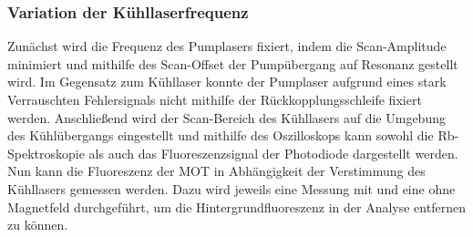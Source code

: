 \documentclass[11pt, a4paper]{article}
\numberwithin{equation}{section}
\begin{document}
\subsubsection{Variation der Kühllaserfrequenz}
\label{sec:detuning_cooling}
Zunächst wird die Frequenz des Pumplasers fixiert, indem die Scan-Amplitude minimiert und mithilfe des Scan-Offset der Pumpübergang auf Resonanz gestellt wird.
Im Gegensatz zum Kühllaser konnte der Pumplaser aufgrund eines stark Verrauschten Fehlersignals nicht mithilfe der Rückkopplungsschleife fixiert werden.
Anschließend wird der Scan-Bereich des Kühllasers auf die Umgebung des Kühlübergangs eingestellt und mithilfe des Oszilloskops kann sowohl die Rb-Spektroskopie als auch das Fluoreszenzsignal der Photodiode dargestellt werden.
Nun kann die Fluoreszenz der MOT in Abhängigkeit der Verstimmung des Kühllasers gemessen werden.
Dazu wird jeweils eine Messung mit und eine ohne Magnetfeld durchgeführt, um die Hintergrundfluoreszenz in der Analyse entfernen zu können.
\end{document}
